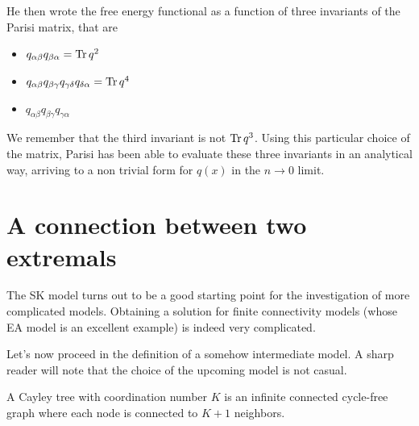 He then wrote the free energy functional as a function of three invariants of the Parisi matrix, that are
\begin{itemize}

\item{ $q_{\alpha\beta} q_{\beta\alpha} = \operatorname{Tr} q^2$}
\item{ $q_{\alpha\beta} q_{\beta\gamma} q_{\gamma\delta}q_{\delta\alpha} =  \operatorname{Tr} q^4$ }
\item{ $q_{\alpha\beta} q_{\beta\gamma} q_{\gamma\alpha}$ }

\end{itemize}

We remember that the third invariant is not $\operatorname{Tr} q^3$.
Using this particular choice of the matrix, Parisi has been able to evaluate these three invariants in an analytical way, arriving to a non trivial form for $q(x)$ in the $n\rightarrow 0 $ limit.

\section{A connection between two extremals}

The SK model turns out to be a good starting point for the investigation of more complicated models. Obtaining a solution for finite connectivity models (whose EA model is an excellent example) is indeed very complicated.

Let's now proceed in the definition of a somehow intermediate model. A sharp reader will note that the choice of the upcoming model is not casual. 




\newline
\begin{definition}

A Cayley tree with coordination number $K$ is an infinite connected cycle-free graph where each node is connected to $K+1$ neighbors.

\end{definition}


